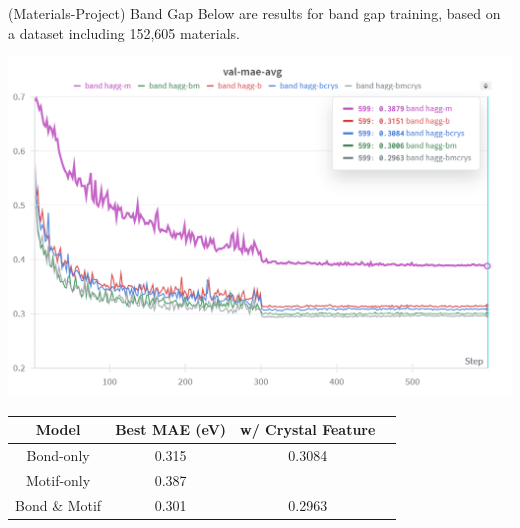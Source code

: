 \documentclass[11pt]{beamer}
\begin{document}
\begin{frame}{(Materials-Project) Band Gap}
Below are results for band gap training, based on a dataset including 152,605 materials.
\begin{center}\small
\includegraphics[scale=0.4]{band_gap.png}

\medskip

\begin{tabular}{c|ccc}
Model & Best MAE (eV) & w/ Crystal Feature \\
\hline
Bond-only & 0.315 & 0.3084 \\
Motif-only & 0.387 & \\
Bond \& Motif & 0.301 & 0.2963\\
\end{tabular}
\end{center}
\end{frame}
\end{document}
